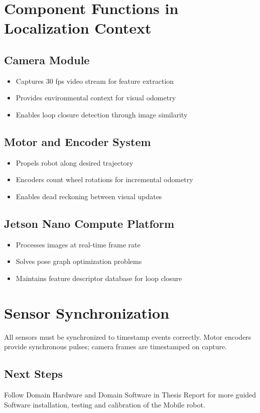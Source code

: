 \section{Component Functions in Localization Context}

\subsection{Camera Module}
\begin{itemize}
    \item Captures 30 fps video stream for feature extraction
    \item Provides environmental context for visual odometry
    \item Enables loop closure detection through image similarity
\end{itemize}

\subsection{Motor and Encoder System}
\begin{itemize}
    \item Propels robot along desired trajectory
    \item Encoders count wheel rotations for incremental odometry
    \item Enables dead reckoning between visual updates
\end{itemize}

\subsection{Jetson Nano Compute Platform}
\begin{itemize}
    \item Processes images at real-time frame rate
    \item Solves pose graph optimization problems
    \item Maintains feature descriptor database for loop closure
\end{itemize}

\section{Sensor Synchronization}
All sensors must be synchronized to timestamp events correctly. Motor encoders provide synchronous pulses; camera frames are timestamped on capture. 
\subsection{Next Steps}
Follow Domain Hardware and Domain Software in Thesis Report for more guided Software installation, testing and calibration of the Mobile robot.

